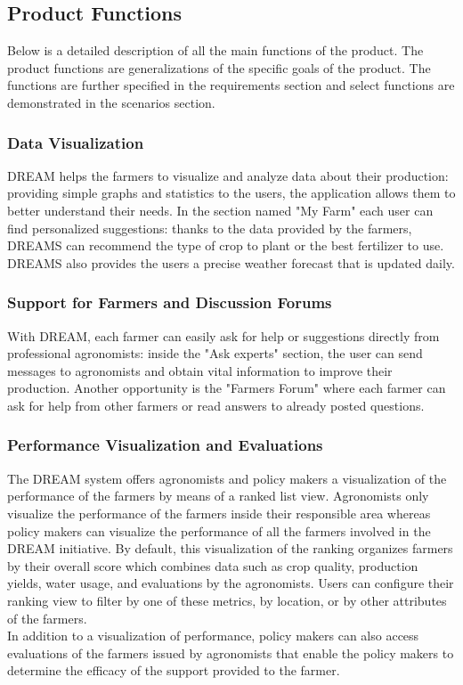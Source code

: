 \subsection{Product Functions}
\begin{flushleft}

Below is a detailed description of all the main functions of the product. The product functions are generalizations of the specific goals of the product. The functions are further specified in the requirements section and select functions are demonstrated in the scenarios section. 

\subsubsection{Data Visualization}
DREAM helps the farmers to visualize and analyze data about their production: providing simple graphs and statistics to the users, the application allows them to better understand their needs. In the section named "My Farm" each user can find personalized suggestions: thanks to the data provided by the farmers, DREAMS can recommend the type of crop to plant or the best fertilizer to use. DREAMS also provides the users a precise weather forecast that is updated daily.

\subsubsection{Support for Farmers and Discussion Forums}
With DREAM, each farmer can easily ask for help or suggestions directly from professional agronomists: inside the "Ask experts" section, the user can send messages to agronomists and obtain vital information to improve their production. Another opportunity is the "Farmers Forum" where each farmer can ask for help from other farmers or read answers to already posted questions.

\subsubsection{Performance Visualization and Evaluations}
The DREAM system offers agronomists and policy makers a visualization of the performance of the farmers by means of a ranked list view. Agronomists only visualize the performance of the farmers inside their responsible area whereas policy makers can visualize the performance of all the farmers involved in the DREAM initiative. By default, this visualization of the ranking organizes farmers by their overall score which combines data such as crop quality, production yields, water usage, and evaluations by the agronomists. Users can configure their ranking view to filter by one of these metrics, by location, or by other attributes of the farmers. \\
\smallskip
In addition to a visualization of performance, policy makers can also access evaluations of the farmers issued by agronomists that enable the policy makers to determine the efficacy of the support provided to the farmer. 


\end{flushleft}
